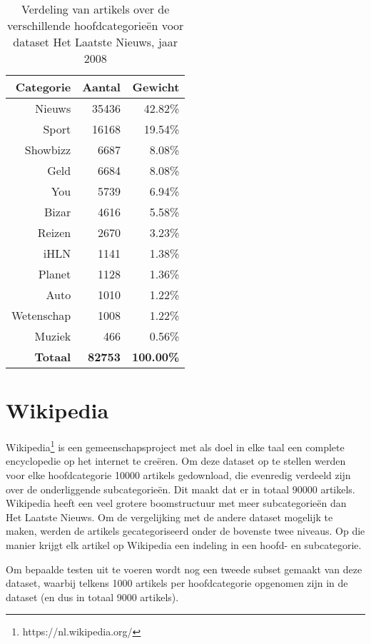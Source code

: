 \begin{table}[htbp]
	\centering
	\caption{Verdeling van artikels over de verschillende hoofdcategorie\"en voor dataset Het Laatste Nieuws, jaar 2008}
	\begin{tabular}{rrr}
		\toprule
		Categorie & Aantal & Gewicht \\
		\midrule
		Nieuws & 35436 & 42.82\% \\
		Sport & 16168 & 19.54\% \\
		Showbizz & 6687  & 8.08\% \\
		Geld  & 6684  & 8.08\% \\
		You   & 5739  & 6.94\% \\
		Bizar & 4616  & 5.58\% \\
		Reizen & 2670  & 3.23\% \\
		iHLN  & 1141  & 1.38\% \\
		Planet & 1128  & 1.36\% \\
		Auto  & 1010  & 1.22\% \\
		Wetenschap & 1008  & 1.22\% \\
		Muziek & 466   & 0.56\% \\
		\textbf{Totaal} & \textbf{82753} & \textbf{100.00\%} \\
		\bottomrule
	\end{tabular}%
	\label{tab:hln-2008-cat}%
\end{table}%

\section{Wikipedia}
Wikipedia\footnote{https://nl.wikipedia.org/} is een gemeenschapsproject met als doel in elke taal een complete encyclopedie op het internet te creëren. Om deze dataset op te stellen werden voor elke hoofdcategorie 10000 artikels gedownload, die evenredig verdeeld zijn over de onderliggende subcategorie\"en. Dit maakt dat er in totaal 90000 artikels. Wikipedia heeft een veel grotere boomstructuur met meer subcategorie\"en dan Het Laatste Nieuws. Om de vergelijking met de andere dataset mogelijk te maken, werden de artikels  gecategoriseerd onder de bovenste twee niveaus. Op die manier krijgt elk artikel op Wikipedia een indeling in een hoofd- en subcategorie. 

Om bepaalde testen uit te voeren wordt nog een tweede subset gemaakt van deze dataset, waarbij telkens 1000 artikels per hoofdcategorie opgenomen zijn in de dataset (en dus in totaal 9000 artikels).